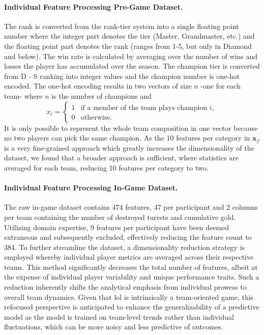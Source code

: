 \documentclass[12pt, a4paper, headinclude, twoside, plainheadsepline, open=right, numbers=noenddot, hidelinks, toc=listof, toc=bibliography]{scrreprt}
\begin{document}
\paragraph{Individual Feature Processing Pre-Game Dataset.}
The rank is converted from the rank-tier system into a single floating point number where the integer part denotes the tier (Master, Grandmaster, etc.) and the floating point part denotes the rank (ranges from 1-5, but only in Diamond and below).
The win rate is calculated by averaging over the number of wins and losses the player has accumulated over the season.
The champion tier is converted from D - S ranking into integer values and the champion number is one-hot encoded.
The one-hot encoding results in two vectors of size $n$ -one for each team- where $n$ is the number of champions and 
\begin{equation*}
x_i = 
\begin{cases}
	1 & \text{if a member of the team plays champion } i, \\
	0 & \text{otherwise}.
\end{cases}
\end{equation*}
It is only possible to represent the whole team composition in one vector because no two players can pick the same champion.
As the 10 features per category in $\mathbf{x}_f$ is a very fine-grained approach which greatly increases the dimensionality of the dataset, 
we found that a broader approach is sufficient, where statistics are averaged for each team, reducing 10 features per category to two.

\paragraph{Individual Feature Processing In-Game Dataset.}
The raw in-game dataset contains 474 features, 47 per participant and 2 columns per team containing the number of destroyed turrets and cumulative gold.
Utilizing domain expertise, 9 features per participant have been deemed extraneous and subsequently excluded, effectively reducing the feature count to 384. 
To further streamline the dataset, a dimensionality reduction strategy is employed whereby individual player metrics are averaged across their respective teams.
This method significantly decreases the total number of features, albeit at the expense of individual player variability and unique performance traits.
Such a reduction inherently shifts the analytical emphasis from individual prowess to overall team dynamics. 
Given that \ac{lol} is intrinsically a team-oriented game, this refocused perspective is anticipated to enhance the generalizability of a predictive model as the model is trained on team-level trends rather than individual fluctuations, which can be more noisy and less predictive of outcomes.
\end{document}
